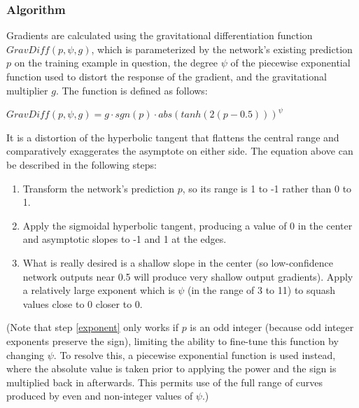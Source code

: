 \documentclass[10pt]{article}
\begin{document}
\subsubsection{Algorithm}

Gradients are calculated using the gravitational differentiation function $GravDiff(p, \psi, g)$, which is parameterized by the network's existing prediction $p$ on the training example in question, the degree $\psi$ of the piecewise exponential function used to distort the response of the gradient, and the gravitational multiplier $g$. The function is defined as follows:

$GravDiff(p, \psi, g) = g \cdot sgn(p) \cdot abs(tanh(2(p - 0.5))) ^ \psi$

It is a distortion of the hyperbolic tangent that flattens the central range and comparatively exaggerates the asymptote on either side. The equation above can be described in the following steps:

\begin{enumerate}
    \item Transform the network's prediction $p$, so its range is 1 to -1 rather than 0 to 1.
    \item Apply the sigmoidal hyperbolic tangent, producing a value of 0 in the center and asymptotic slopes to -1 and 1 at the edges.
    \item \label{exponent} What is really desired is a shallow slope in the center (so low-confidence network outputs near 0.5 will produce very shallow output gradients). Apply a relatively large exponent which is $\psi$ (in the range of 3 to 11) to squash values close to 0 closer to 0.
\end{enumerate}

(Note that step \ref{exponent} only works if $p$ is an odd integer (because odd integer exponents preserve the sign), limiting the ability to fine-tune this function by changing $\psi$. To resolve this, a piecewise exponential function is used instead, where the absolute value is taken prior to applying the power and the sign is multiplied back in afterwards. This permits use of the full range of curves produced by even and non-integer values of $\psi$.)
\end{document}
